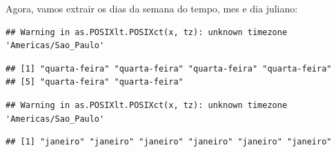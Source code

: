 \documentclass[]{book}
\newenvironment{Shaded}{\begin{snugshade}}{\end{snugshade}}
\newcommand{\KeywordTok}[1]{\textcolor[rgb]{0.13,0.29,0.53}{\textbf{#1}}}
\newcommand{\StringTok}[1]{\textcolor[rgb]{0.31,0.60,0.02}{#1}}
\newcommand{\OperatorTok}[1]{\textcolor[rgb]{0.81,0.36,0.00}{\textbf{#1}}}
\newcommand{\NormalTok}[1]{#1}
\theoremstyle{definition}
\theoremstyle{definition}
\theoremstyle{definition}
\theoremstyle{remark}
\begin{document}
Agora, vamos extrair os dias da semana do tempo, mes e dia juliano:

\begin{Shaded}
\end{Shaded}

\begin{verbatim}
## Warning in as.POSIXlt.POSIXct(x, tz): unknown timezone 'Americas/Sao_Paulo'
\end{verbatim}

\begin{Shaded}
\end{Shaded}

\begin{verbatim}
## [1] "quarta-feira" "quarta-feira" "quarta-feira" "quarta-feira"
## [5] "quarta-feira" "quarta-feira"
\end{verbatim}

\begin{Shaded}
\end{Shaded}

\begin{verbatim}
## Warning in as.POSIXlt.POSIXct(x, tz): unknown timezone 'Americas/Sao_Paulo'
\end{verbatim}

\begin{Shaded}
\end{Shaded}

\begin{verbatim}
## [1] "janeiro" "janeiro" "janeiro" "janeiro" "janeiro" "janeiro"
\end{verbatim}

\begin{Shaded}
\end{Shaded}
\end{document}

